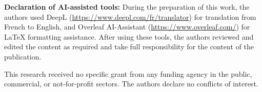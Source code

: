 \documentclass{ieeeaccess}
\begin{document}
\textbf{Declaration of AI-assisted tools:} During the preparation of this work, the authors used DeepL (\url{https://www.deepl.com/fr/translator}) for translation from French to English, and Overleaf AI-Assistant 
(\url{https://www.overleaf.com/}) for LaTeX formatting assistance. After using these tools, the authors reviewed and edited the content as required and take full responsibility for the content of the publication.

This research received no specific grant from any funding agency in the public, commercial, or not-for-profit sectors.
The authors declare no conflicts of interest.

\end{document}
